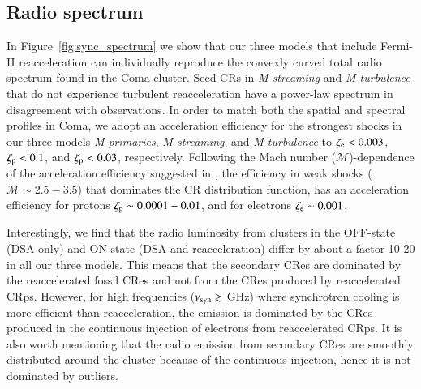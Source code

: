 \documentclass[fleqn,usenatbib,useAMS]{mnras}
\newcommand{\Mstream}{{\it M-streaming}\xspace}
\newcommand{\Mflatturb}{{\it M-turbulence}\xspace}
\newcommand{\Mprimary}{{\it M-primaries}\xspace}
\begin{document}
\subsection{Radio spectrum}
\label{sect:radio_spec}
In Figure~\ref{fig:sync_spectrum} we show that our three models that
include Fermi-II reacceleration can individually reproduce the
convexly curved total radio spectrum found in the Coma cluster. Seed
CRs in \Mstream and \Mflatturb that do not experience turbulent
reacceleration have a power-law spectrum in disagreement with
observations. In order to match both the spatial and spectral profiles
in Coma, we adopt an acceleration efficiency for the strongest shocks
in our three models \Mprimary, \Mstream, and \Mflatturb to
$\zeta_{{\mathrm{e}}} <0.003$, $\zeta_{{\mathrm{p}}} < 0.1$, and
$\zeta_{{\mathrm{p}}}<0.03$, respectively. Following the Mach number
($\mathcal{M}$)-dependence of the acceleration efficiency suggested in
\cite{pinzke13}, the efficiency in weak shocks ($\mathcal{M}\sim
2.5-3.5$) that dominates the CR distribution function, has an
acceleration efficiency for protons $\zeta_{{\mathrm{p}}}\sim0.0001-0.01$,
and for electrons $\zeta_{{\mathrm{e}}}\sim 0.001$.

Interestingly, we find that the radio luminosity from clusters in the
OFF-state (DSA only) and ON-state (DSA and reacceleration) differ by
about a factor 10-20 in all our three models. This means that the
secondary CRes are dominated by the reaccelerated fossil CRes and not
from the CRes produced by reaccelerated CRps. However, for high
frequencies ($\nu_{\mathrm{syn}}\gtrsim$ GHz) where synchrotron cooling is
more efficient than reacceleration, the emission is dominated by the
CRes produced in the continuous injection of electrons from
reaccelerated CRps. It is also worth mentioning that the radio
emission from secondary CRes are smoothly distributed around the
cluster because of the continuous injection, hence it is not
dominated by outliers.
\end{document}
